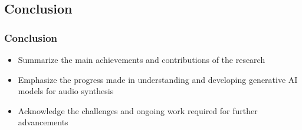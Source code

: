 \subsection{Conclusion}

\begin{frame}
    \frametitle{Conclusion}
    \begin{itemize}
        \item Summarize the main achievements and contributions of the research
        \item Emphasize the progress made in understanding and developing generative AI models for audio synthesis
        \item Acknowledge the challenges and ongoing work required for further advancements
    \end{itemize}
\end{frame}
